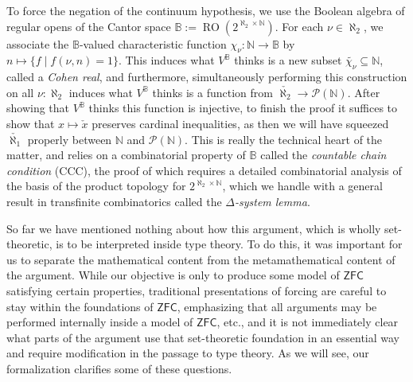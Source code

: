\documentclass[a4paper,USenglish,cleveref, autoref]{lipics-v2019}
\newcommand{\B}{\mathbb{B}}
\theoremstyle{definition}
\begin{document}
To force the negation of the continuum hypothesis, we use the Boolean algebra of regular opens of the Cantor space $\B := \operatorname{RO}(2^{\aleph_2 \times \mathbb{N}})$. For each $\nu \in \aleph_2$, we associate the $\B$-valued characteristic function $\chi_\nu : \mathbb{N} \to \B$ by $n \mapsto \{f \operatorname{|} f(\nu, n) = 1\}$. This induces what $V^\B$ thinks is a new subset $\widetilde{\chi_{\nu}} \subseteq \mathbb{N}$, called a \emph{Cohen real}, and furthermore, simultaneously performing this construction on all $\nu : \aleph_2$ induces what $V^\B$ thinks is a function from $\check{\aleph_2} \to \mathcal{P}(\mathbb{N})$. After showing that $V^\B$ thinks this function is injective, to finish the proof it suffices to show that $x \mapsto \check{x}$ preserves cardinal inequalities, as then we will have squeezed $\check{\aleph_1}$ properly between $\mathbb{N}$ and $\mathcal{P}(\mathbb{N})$. This is really the technical heart of the matter, and relies on a combinatorial property of $\B$ called the \emph{countable chain condition} (CCC), the proof of which requires a detailed combinatorial analysis of the basis of the product topology for $2^{\aleph_2 \times \mathbb{N}}$, which we handle with a general result in transfinite combinatorics called the \emph{$\Delta$-system lemma}.

So far we have mentioned nothing about how this argument, which is wholly set-theoretic, is to be interpreted inside type theory. To do this, it was important for us to separate the mathematical content from the metamathematical content of the argument. While our objective is only to produce some model of $\mathsf{ZFC}$ satisfying certain properties, traditional presentations of forcing are careful to stay within the foundations of $\mathsf{ZFC}$, emphasizing that all arguments may be performed internally inside a model of $\mathsf{ZFC}$, etc., and it is not immediately clear what parts of the argument use that set-theoretic foundation in an essential way %
and require modification in the passage to type theory. As we will see, our formalization clarifies some of these questions.
\end{document}
